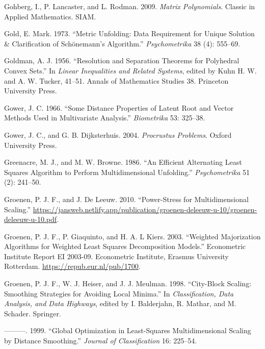 \documentclass[
  12pt,
  letterpaper,
  DIV=11,
  numbers=noendperiod]{scrreprt}
\newlength{\cslhangindent}
\newenvironment{CSLReferences}[2] %
 {\begin{list}{}{%
  \setlength{\itemindent}{0pt}
  \setlength{\leftmargin}{0pt}
  \setlength{\parsep}{0pt}
  \ifodd #1
   \setlength{\leftmargin}{\cslhangindent}
   \setlength{\itemindent}{-1\cslhangindent}
  \fi
  \setlength{\itemsep}{#2\baselineskip}}}
 {\end{list}}
\theoremstyle{remark}
\begin{document}
\begin{CSLReferences}{1}{0}
Gohberg, I., P. Lancaster, and L. Rodman. 2009. \emph{Matrix
Polynomials}. Classic in Applied Mathematics. SIAM.

Gold, E. Mark. 1973. {``{Metric Unfolding: Data Requirement for Unique
Solution \& Clarification of Sch{ö}nemann's Algorithm}.''}
\emph{Psychometrika} 38 (4): 555--69.

Goldman, A. J. 1956. {``{Resolution and Separation Theorems for
Polyhedral Convex Sets}.''} In \emph{Linear Inequalities and Related
Systems}, edited by Kuhn H. W. and A. W. Tucker, 41--51. Annals of
Mathematics Studies 38. Princeton University Press.

Gower, J. C. 1966. {``{Some Distance Properties of Latent Root and
Vector Methods Used in Multivariate Analysis}.''} \emph{Biometrika} 53:
325--38.

Gower, J. C., and G. B. Dijksterhuis. 2004. \emph{Procrustus Problems}.
Oxford University Press.

Greenacre, M. J., and M. W. Browne. 1986. {``{An Efficient Alternating
Least Squares Algorithm to Perform Multidimensional Unfolding}.''}
\emph{Psychometrika} 51 (2): 241--50.

Groenen, P. J. F., and J. De Leeuw. 2010. {``{Power-Stress for
Multidimensional Scaling}.''}
\url{https://jansweb.netlify.app/publication/groenen-deleeuw-u-10/groenen-deleeuw-u-10.pdf}.

Groenen, P. J. F., P. Giaquinto, and H. A. L Kiers. 2003. {``{Weighted
Majorization Algorithms for Weighted Least Squares Decomposition
Models}.''} Econometric Institute Report EI 2003-09. Econometric
Institute, Erasmus University Rotterdam.
\url{https://repub.eur.nl/pub/1700}.

Groenen, P. J. F., W. J. Heiser, and J. J. Meulman. 1998. {``{City-Block
Scaling: Smoothing Strategies for Avoiding Local Minima}.''} In
\emph{Classification, Data Analysis, and Data Highways}, edited by I.
Balderjahn, R. Mathar, and M. Schader. Springer.

---------. 1999. {``{Global Optimization in Least-Squares
Multidimensional Scaling by Distance Smoothing}.''} \emph{Journal of
Classification} 16: 225--54.


\end{CSLReferences}
\end{document}
